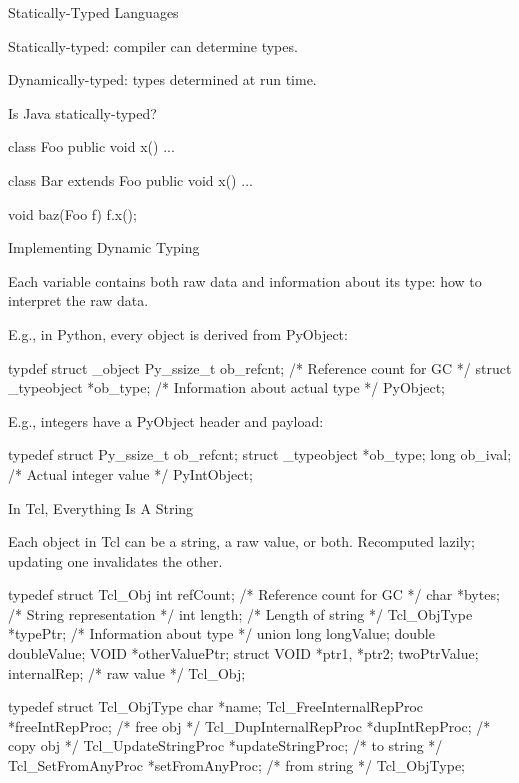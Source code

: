 \documentclass{plt}
\begin{document}
\begin{frame}[fragile]{Statically-Typed Languages}

Statically-typed: compiler can determine types.

Dynamically-typed: types determined at run time.

Is Java statically-typed?

\begin{java}
class Foo {
   public void x() { ... }
}

class Bar extends Foo {
   public void x() { ... }
}

void baz(Foo f) {
  f.x();
}
\end{java}

\end{frame}

\begin{frame}[fragile=singleslide]{Implementing Dynamic Typing}

  Each variable contains both raw data and information about its type:
  how to interpret the raw data.

  E.g., in Python, every object is derived from PyObject:

\begin{C}
typdef struct _object {
  Py_ssize_t ob_refcnt;        /* Reference count for GC */
  struct _typeobject *ob_type; /* Information about actual type */
} PyObject;
\end{C}

E.g., integers have a PyObject header and payload:

\begin{C}
typedef struct {
  Py_ssize_t ob_refcnt;
  struct _typeobject *ob_type;
  long ob_ival;               /* Actual integer value */
} PyIntObject;
\end{C}
  
\end{frame}

\begin{frame}[fragile=singleslide]{In Tcl, Everything Is A String}

  Each object in Tcl can be a string, a raw value, or both.
  Recomputed lazily; updating one invalidates the other.

\begin{C}
typedef struct Tcl_Obj {
  int refCount;         /* Reference count for GC */
  char *bytes;          /* String representation */
  int length;           /* Length of string */
  Tcl_ObjType *typePtr; /* Information about type */
  union {
    long longValue;
    double doubleValue;
    VOID *otherValuePtr;
    struct { VOID *ptr1, *ptr2; } twoPtrValue;
  } internalRep;  /* raw value */
} Tcl_Obj;

typedef struct Tcl_ObjType {
  char *name;
  Tcl_FreeInternalRepProc *freeIntRepProc; /* free obj */
  Tcl_DupInternalRepProc *dupIntRepProc;   /* copy obj */
  Tcl_UpdateStringProc *updateStringProc;  /* to string */
  Tcl_SetFromAnyProc *setFromAnyProc;      /* from string */
} Tcl_ObjType;
\end{C}

\end{frame}
\end{document}
